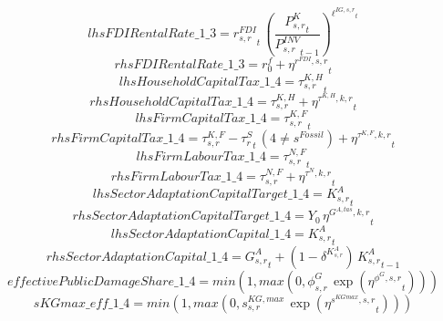 \begin{dmath*}
lhsFDIRentalRate\_1\_3 = {{r^{FDI}_{s,r}}}_{t}\, \left(\frac{{{P^K_{s,r}}}_{t}}{{{P^{INV}_{s,r}}}_{t-1}}\right)^{{{\ell^{IG,s,r}}}_{t}}
\end{dmath*}
\begin{dmath*}
rhsFDIRentalRate\_1\_3 = {{r^f_0}}+{{\eta^{r^{FDI},s,r}}}_{t}
\end{dmath*}
\begin{dmath*}
lhsHouseholdCapitalTax\_1\_4 = {{\tau^{K,H}_{s,r}}}_{t}
\end{dmath*}
\begin{dmath*}
rhsHouseholdCapitalTax\_1\_4 = {{\tau^{K,H}_{s,r}}}+{{\eta^{\tau^{K,H},k,r}}}_{t}
\end{dmath*}
\begin{dmath*}
lhsFirmCapitalTax\_1\_4 = {{\tau^{K,F}_{s,r}}}_{t}
\end{dmath*}
\begin{dmath*}
rhsFirmCapitalTax\_1\_4 = {{\tau^{K,F}_{s,r}}}-{{\tau^{S}_{r}}}_{t}\, \left(4\neq {{s^{Fossil}}}\right)+{{\eta^{\tau^{K,F},k,r}}}_{t}
\end{dmath*}
\begin{dmath*}
lhsFirmLabourTax\_1\_4 = {{\tau^{N,F}_{s,r}}}_{t}
\end{dmath*}
\begin{dmath*}
rhsFirmLabourTax\_1\_4 = {{\tau^{N,F}_{s,r}}}+{{\eta^{\tau^{N},k,r}}}_{t}
\end{dmath*}
\begin{dmath*}
lhsSectorAdaptationCapitalTarget\_1\_4 = {{K^{A}_{s,r}}}_{t}
\end{dmath*}
\begin{dmath*}
rhsSectorAdaptationCapitalTarget\_1\_4 = {{Y_0}}\, {{\eta^{G^{A,tas},k,r}}}_{t}
\end{dmath*}
\begin{dmath*}
lhsSectorAdaptationCapital\_1\_4 = {{K^{A}_{s,r}}}_{t}
\end{dmath*}
\begin{dmath*}
rhsSectorAdaptationCapital\_1\_4 = {{G^{A}_{s,r}}}_{t}+\left(1-{{\delta^{K^{A}_{s,r}}}}\right)\, {{K^{A}_{s,r}}}_{t-1}
\end{dmath*}
\begin{dmath*}
effectivePublicDamageShare\_1\_4 = min(1,max(0,{{\phi^{G}_{s,r}}}\, \exp\left({{\eta^{\phi^{G},s,r}}}_{t}\right)))
\end{dmath*}
\begin{dmath*}
sKGmax\_eff\_1\_4 = min(1,max(0,{{s^{KG,max}_{s,r}}}\, \exp\left({{\eta^{s^{KGmax},s,r}}}_{t}\right)))
\end{dmath*}
